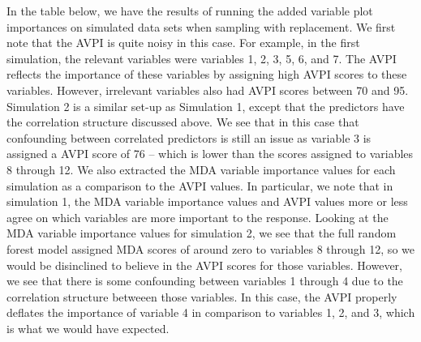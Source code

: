 \documentclass[12pt,twoside]{reedthesis}
\theoremstyle{definition}
\theoremstyle{definition}
\theoremstyle{definition}
\theoremstyle{remark}
\begin{document}
In the table below, we have the results of running the added variable
plot importances on simulated data sets when sampling with replacement.
We first note that the AVPI is quite noisy in this case. For example, in
the first simulation, the relevant variables were variables 1, 2, 3, 5,
6, and 7. The AVPI reflects the importance of these variables by
assigning high AVPI scores to these variables. However, irrelevant
variables also had AVPI scores between 70 and 95. Simulation 2 is a
similar set-up as Simulation 1, except that the predictors have the
correlation structure discussed above. We see that in this case that
confounding between correlated predictors is still an issue as variable
3 is assigned a AVPI score of 76 -- which is lower than the scores
assigned to variables 8 through 12. We also extracted the MDA variable
importance values for each simulation as a comparison to the AVPI
values. In particular, we note that in simulation 1, the MDA variable
importance values and AVPI values more or less agree on which variables
are more important to the response. Looking at the MDA variable
importance values for simulation 2, we see that the full random forest
model assigned MDA scores of around zero to variables 8 through 12, so
we would be disinclined to believe in the AVPI scores for those
variables. However, we see that there is some confounding between
variables 1 through 4 due to the correlation structure betweeen those
variables. In this case, the AVPI properly deflates the importance of
variable 4 in comparison to variables 1, 2, and 3, which is what we
would have expected.
\end{document}
